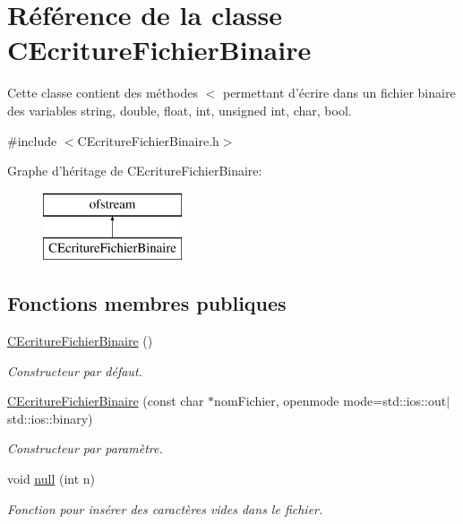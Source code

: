 \hypertarget{class_c_ecriture_fichier_binaire}{\section{Référence de la classe C\-Ecriture\-Fichier\-Binaire}
\label{class_c_ecriture_fichier_binaire}
}


Cette classe contient des méthodes $<$ permettant d'écrire dans un fichier binaire des variables string, double, float, int, unsigned int, char, bool.  




{\ttfamily \#include $<$C\-Ecriture\-Fichier\-Binaire.\-h$>$}

Graphe d'héritage de C\-Ecriture\-Fichier\-Binaire\-:\begin{figure}[H]
\begin{center}
\leavevmode
\includegraphics[height=2.000000cm]{class_c_ecriture_fichier_binaire}
\end{center}
\end{figure}
\subsection*{Fonctions membres publiques}
\begin{DoxyCompactItemize}
\item 
\hyperlink{group__utilitaire_ga5b5846202001fecd71cd2a0afbbdb494}{C\-Ecriture\-Fichier\-Binaire} ()
\begin{DoxyCompactList}\small\item\em Constructeur par défaut. \end{DoxyCompactList}\item 
\hyperlink{group__utilitaire_gad19b9753aa12a9f25fd0febc3c899024}{C\-Ecriture\-Fichier\-Binaire} (const char $\ast$nom\-Fichier, openmode mode=std\-::ios\-::out$\vert$std\-::ios\-::binary)
\begin{DoxyCompactList}\small\item\em Constructeur par paramètre. \end{DoxyCompactList}\item 
void \hyperlink{group__utilitaire_ga7145545254c30909311d3b1ef0bdd07a}{null} (int n)
\begin{DoxyCompactList}\small\item\em Fonction pour insérer des caractères vides dans le fichier. \end{DoxyCompactList}\end{DoxyCompactItemize}
